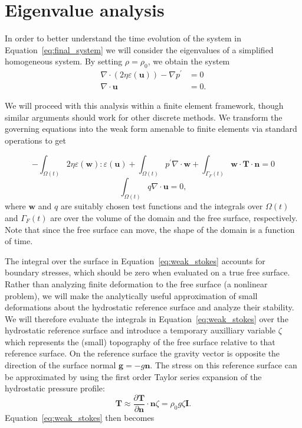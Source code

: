 \documentclass[preprint,12pt,authoryear]{elsarticle}
\begin{document}
\section{Eigenvalue analysis}
\label{sec:eigenvalue}

In order to better understand the time evolution of the system in Equation~\eqref{eq:final_system}
we will consider the eigenvalues of a simplified homogeneous system. By setting $\rho = \rho_0$, we obtain the system
\begin{equation}
\begin{aligned}
\nabla \cdot \left( 2 \eta \varepsilon( \mathbf{u} ) \right) - \nabla p^\prime &= 0 \\
\nabla \cdot \mathbf{u} &= 0.
\end{aligned}
\label{eq:homogeneous_stokes}
\end{equation}


We will proceed with this analysis within a finite element framework, though similar arguments should 
work for other discrete methods.
We transform the governing equations into the weak form amenable to finite elements via standard operations \citep[e.g.][]{zienkiewicz1977finite} to get

\begin{equation}
-\int_{\Omega(t)} 2 \eta \varepsilon( \mathbf{w} ) \colon \varepsilon( \mathbf{u} ) + \int_{\Omega(t)} p^\prime \nabla \cdot \mathbf{w} 
+ \int_{\Gamma_F(t)} \mathbf{w} \cdot \mathbf{T} \cdot \mathbf{n} = 0 
\label{eq:weak_stokes}
\end{equation}
\begin{equation}
\int_{\Omega(t)} q \nabla \cdot \mathbf{u} = 0,
\label{eq:weak_incompressible}
\end{equation}
where $\mathbf{w}$ and $q$ are suitably chosen test functions and the integrals over 
$\Omega(t)$ and $\Gamma_F(t)$ are over the volume of the domain and the free surface, respectively.
Note that since the free surface can move, the shape of the domain is a function of time.

The integral over the surface in Equation~\eqref{eq:weak_stokes} accounts for boundary stresses, 
which should be zero when evaluated on a true free surface.
Rather than analyzing finite deformation to the free surface (a nonlinear problem),
we will make the analytically useful approximation of small deformations about the hydrostatic 
reference surface and analyze their stability.
We will therefore  evaluate the integrals in Equation~\eqref{eq:weak_stokes} 
over the hydrostatic reference surface and introduce a temporary auxilliary variable $\zeta$ which 
represents the (small) topography of the free surface relative to that reference surface.
On the reference surface the gravity vector is opposite the direction of the surface normal $\mathbf{g} = -g \mathbf{n}$.
The stress on this reference surface can be approximated by using the first order Taylor series
expansion of the hydrostatic pressure profile:
\begin{equation}
\mathbf{T} \approx \frac{\partial \mathbf{T}}{\partial \mathbf{n} } \cdot \mathbf{n} \zeta = \rho_0 g \zeta \mathbf{I}.
\label{eq:hydrostatic}
\end{equation}
Equation~\eqref{eq:weak_stokes} then becomes
\end{document}
